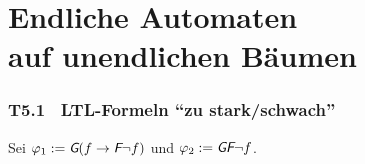 \documentclass[fontsize=11pt, twoside=false, numbers=autoenddot]{scrbook}
\begin{document}
%    
%    

\part[Endliche Automaten auf unendlichen Bäumen]{Endliche Automaten \\ auf unendlichen Bäumen}

\section*{T5.1~ LTL-Formeln "`zu stark/schwach"'}

Sei $\varphi_1 := \textit{\textsf{G}}(f \to \textit{\textsf{F}} \neg f)$ und $\varphi_2 := \textit{\textsf{G}}\textit{\textsf{F}}\neg f$.
\end{document}
